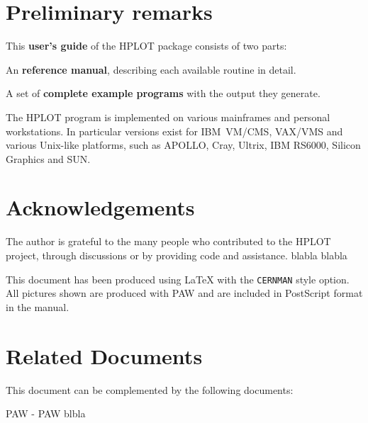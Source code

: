 \setcounter{page}{1}
\section*{Preliminary remarks}
\par This {\bf user's guide} of the HPLOT package
consists of two parts:
\begin{OL}
\item An {\bf reference manual}, describing each available routine
in detail.
\item A set of {\bf complete example programs} with the output
they generate.
\end{OL}
\par The HPLOT program is implemented on various mainframes and personal
workstations. In particular versions exist for IBM~VM/CMS,
VAX/VMS and various Unix-like platforms, such as APOLLO, Cray,
Ultrix, IBM RS6000, Silicon Graphics and SUN.
\begin{center}
\end{center}
\section*{Acknowledgements}
\par
The author is grateful to the many people who contributed to the HPLOT
project, through discussions or by providing code and assistance.
blabla blabla
\par This document has been produced using \LaTeX{} with
the {\tt CERNMAN} style option.
All pictures shown are produced with PAW and are included in
PostScript\cite{bib-POSTSC} format in the manual.
\section*{Related Documents}
\par This document can be complemented by the following documents:
\begin{UL}
\item PAW  - PAW blbla                       \cite{bib-PAW}
\end{UL}
 
\tableofcontents
\listoffigures
